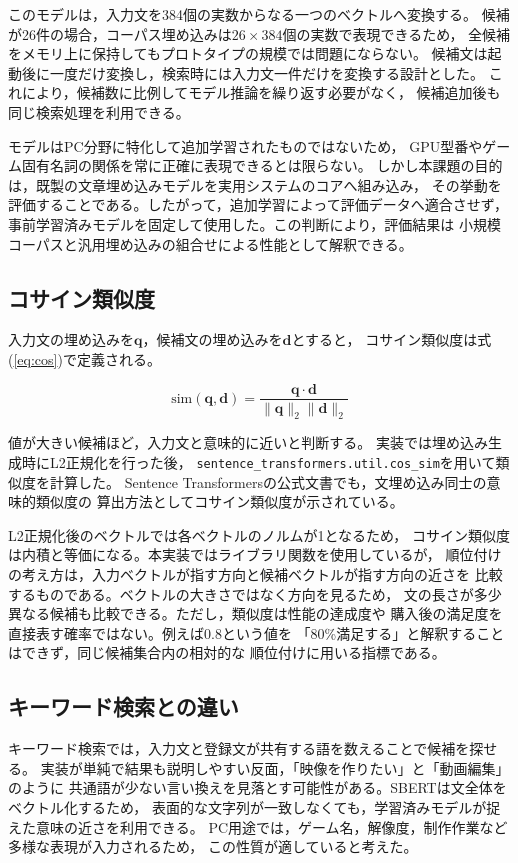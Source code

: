 \documentclass[a4paper,11pt]{article}
\begin{document}
このモデルは，入力文を384個の実数からなる一つのベクトルへ変換する。
候補が26件の場合，コーパス埋め込みは$26\times384$個の実数で表現できるため，
全候補をメモリ上に保持してもプロトタイプの規模では問題にならない。
候補文は起動後に一度だけ変換し，検索時には入力文一件だけを変換する設計とした。
これにより，候補数に比例してモデル推論を繰り返す必要がなく，
候補追加後も同じ検索処理を利用できる。

モデルはPC分野に特化して追加学習されたものではないため，
GPU型番やゲーム固有名詞の関係を常に正確に表現できるとは限らない。
しかし本課題の目的は，既製の文章埋め込みモデルを実用システムのコアへ組み込み，
その挙動を評価することである。したがって，追加学習によって評価データへ適合させず，
事前学習済みモデルを固定して使用した。この判断により，評価結果は
小規模コーパスと汎用埋め込みの組合せによる性能として解釈できる。

\subsection{コサイン類似度}
入力文の埋め込みを$\bm{q}$，候補文の埋め込みを$\bm{d}$とすると，
コサイン類似度は式(\ref{eq:cos})で定義される。

\begin{equation}
  \mathrm{sim}(\bm{q},\bm{d})
  = \frac{\bm{q}\cdot\bm{d}}
  {\|\bm{q}\|_2\|\bm{d}\|_2}
  \label{eq:cos}
\end{equation}

値が大きい候補ほど，入力文と意味的に近いと判断する。
実装では埋め込み生成時にL2正規化を行った後，
\verb|sentence_transformers.util.cos_sim|を用いて類似度を計算した。
Sentence Transformersの公式文書でも，文埋め込み同士の意味的類似度の
算出方法としてコサイン類似度が示されている\cite{STSDoc}。

L2正規化後のベクトルでは各ベクトルのノルムが1となるため，
コサイン類似度は内積と等価になる。本実装ではライブラリ関数を使用しているが，
順位付けの考え方は，入力ベクトルが指す方向と候補ベクトルが指す方向の近さを
比較するものである。ベクトルの大きさではなく方向を見るため，
文の長さが多少異なる候補も比較できる。ただし，類似度は性能の達成度や
購入後の満足度を直接表す確率ではない。例えば0.8という値を
「80\%満足する」と解釈することはできず，同じ候補集合内の相対的な
順位付けに用いる指標である。

\subsection{キーワード検索との違い}
キーワード検索では，入力文と登録文が共有する語を数えることで候補を探せる。
実装が単純で結果も説明しやすい反面，「映像を作りたい」と「動画編集」のように
共通語が少ない言い換えを見落とす可能性がある。SBERTは文全体をベクトル化するため，
表面的な文字列が一致しなくても，学習済みモデルが捉えた意味の近さを利用できる。
PC用途では，ゲーム名，解像度，制作作業など多様な表現が入力されるため，
この性質が適していると考えた。
\end{document}
